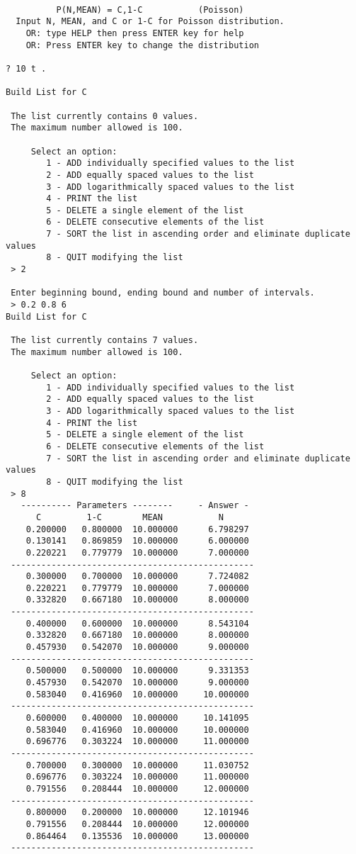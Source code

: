 \documentclass[12pt,dvips]{article}
\begin{document}
\begin{verbatim}

          P(N,MEAN) = C,1-C           (Poisson)
  Input N, MEAN, and C or 1-C for Poisson distribution.
    OR: type HELP then press ENTER key for help
    OR: Press ENTER key to change the distribution

? 10 t .

Build List for C

 The list currently contains 0 values.
 The maximum number allowed is 100.

     Select an option:
        1 - ADD individually specified values to the list
        2 - ADD equally spaced values to the list
        3 - ADD logarithmically spaced values to the list
        4 - PRINT the list
        5 - DELETE a single element of the list
        6 - DELETE consecutive elements of the list
        7 - SORT the list in ascending order and eliminate duplicate values
        8 - QUIT modifying the list
 > 2

 Enter beginning bound, ending bound and number of intervals.
 > 0.2 0.8 6
Build List for C

 The list currently contains 7 values.
 The maximum number allowed is 100.

     Select an option:
        1 - ADD individually specified values to the list
        2 - ADD equally spaced values to the list
        3 - ADD logarithmically spaced values to the list
        4 - PRINT the list
        5 - DELETE a single element of the list
        6 - DELETE consecutive elements of the list
        7 - SORT the list in ascending order and eliminate duplicate values
        8 - QUIT modifying the list
 > 8
   ---------- Parameters --------     - Answer -
      C         1-C        MEAN           N
    0.200000   0.800000  10.000000      6.798297
    0.130141   0.869859  10.000000      6.000000
    0.220221   0.779779  10.000000      7.000000
 ------------------------------------------------
    0.300000   0.700000  10.000000      7.724082
    0.220221   0.779779  10.000000      7.000000
    0.332820   0.667180  10.000000      8.000000
 ------------------------------------------------
    0.400000   0.600000  10.000000      8.543104
    0.332820   0.667180  10.000000      8.000000
    0.457930   0.542070  10.000000      9.000000
 ------------------------------------------------
    0.500000   0.500000  10.000000      9.331353
    0.457930   0.542070  10.000000      9.000000
    0.583040   0.416960  10.000000     10.000000
 ------------------------------------------------
    0.600000   0.400000  10.000000     10.141095
    0.583040   0.416960  10.000000     10.000000
    0.696776   0.303224  10.000000     11.000000
 ------------------------------------------------
    0.700000   0.300000  10.000000     11.030752
    0.696776   0.303224  10.000000     11.000000
    0.791556   0.208444  10.000000     12.000000
 ------------------------------------------------
    0.800000   0.200000  10.000000     12.101946
    0.791556   0.208444  10.000000     12.000000
    0.864464   0.135536  10.000000     13.000000
 ------------------------------------------------

\end{verbatim}
\end{document}
